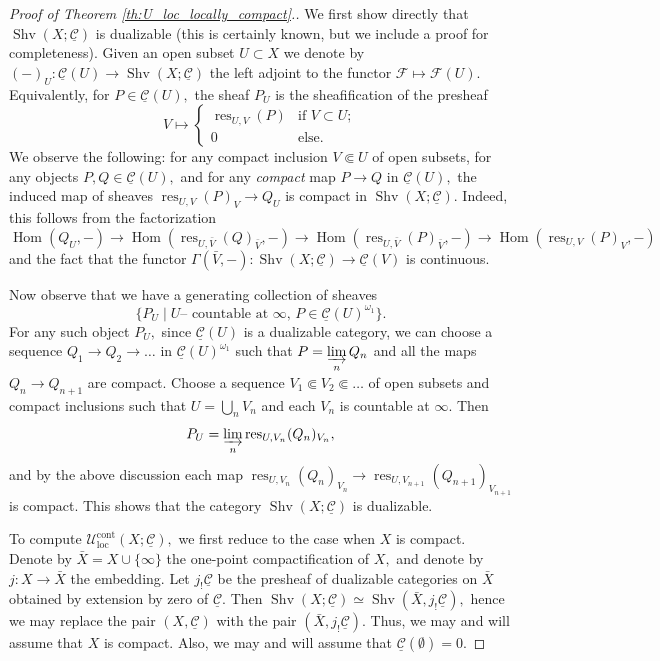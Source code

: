 \documentclass[11pt,leqno]{amsart}
\numberwithin{equation}{section}
\def\Hom{\operatorname{Hom}}
\newcommand{\indlim}[1][]{\mathop{\varinjlim}\limits_{#1}}
\newcommand{\loc}{\operatorname{loc}}
\newcommand{\cont}{\operatorname{cont}}
\newcommand{\cF}{{\mathcal F}}
\newcommand{\cC}{{\mathcal C}}
\newcommand{\cU}{{\mathcal U}}
\newcommand{\un}{\underline}
\newcommand{\Sh}{\operatorname{Shv}}
\newcommand{\res}{\operatorname{res}}
\begin{document}
\begin{proof}[Proof of Theorem \ref{th:U_loc_locally_compact}.]
We first show directly that $\Sh(X;\un{\cC})$ is dualizable (this is certainly known, but we include a proof for completeness). Given an open subset $U\subset X$ we denote by $(-)_U:\un{\cC}(U)\to\Sh(X;\un{\cC})$ the left adjoint to the functor $\cF\mapsto\cF(U).$ Equivalently, for $P\in\un{\cC}(U),$ the sheaf $P_U$ is the sheafification of the presheaf
$$V\mapsto\begin{cases}\res_{U,V}(P) & \text{if }V\subset U;\\
0 & \text{else.}\end{cases}$$
We observe the following: for any compact inclusion $V\Subset U$ of open subsets, for any objects $P,Q\in\un{\cC}(U),$ and for any {\it compact} map $P\to Q$ in $\un{\cC}(U),$ the induced map of sheaves $\res_{U,V}(P)_V\to Q_U$ is compact in $\Sh(X;\un{\cC}).$ Indeed, this follows from the factorization $$\Hom(Q_U,-)\to \Hom(\res_{U,\bar{V}}(Q)_{\bar{V}},-)\to \Hom(\res_{U,\bar{V}}(P)_{\bar{V}},-)\to \Hom(\res_{U,V}(P)_V,-)$$
and the fact that the functor $\Gamma(\bar{V},-):\Sh(X;\un{\cC})\to\un{\cC}(V)$ is continuous.

Now observe that we have a generating collection of sheaves $$\{P_U\mid U\text{-- countable at }\infty,\,P\in\un{\cC}(U)^{\omega_1}\}.$$
For any such object $P_U,$ since $\un{\cC}(U)$ is a dualizable category, we can choose a sequence $Q_1\to Q_2\to\dots$ in $\un{\cC}(U)^{\omega_1}$ such that $P=\indlim[n] Q_n$ and all the maps $Q_n\to Q_{n+1}$ are compact. Choose a sequence $V_1\Subset V_2\Subset\dots$ of open subsets and compact inclusions such that $U=\bigcup_n V_n$ and each $V_n$ is countable at $\infty.$ Then $$P_U=\indlim[n]\res_{U,V_n}(Q_n)_{V_n},$$ and by the above discussion each map $\res_{U,V_n}(Q_n)_{V_n}\to \res_{U,V_{n+1}}(Q_{n+1})_{V_{n+1}}$ is compact. This shows that the category $\Sh(X;\un{\cC})$ is dualizable.

To compute $\cU_{\loc}^{\cont}(X;\un{\cC}),$ we first reduce to the case when $X$ is compact. Denote by $\bar{X}=X\cup\{\infty\}$ the one-point compactification of $X,$ and denote by $j:X\to\bar{X}$ the embedding. Let $j_!\un{\cC}$ be the presheaf of dualizable categories on $\bar{X}$ obtained by extension by zero of $\un{\cC}.$ Then $\Sh(X;\un{\cC})\simeq\Sh(\bar{X},j_!\un{\cC}),$ hence we may replace the pair $(X,\un{\cC})$ with the pair $(\bar{X},j_!\un{\cC}).$ Thus, we may and will assume that $X$ is compact. Also, we may and will assume that $\un{\cC}(\emptyset)=0.$


\end{proof}
\end{document}
